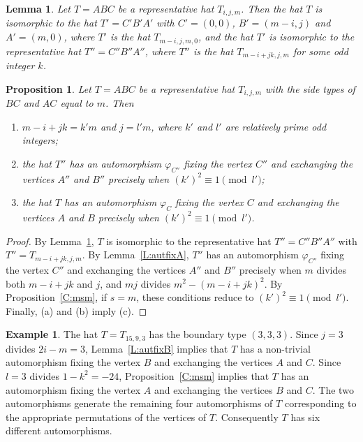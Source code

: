 \documentclass[12pt]{amsart}
\def\p{\varphi}
\theoremstyle{plain}
\newtheorem{proposition}[theorem]{Proposition}
\newtheorem{lemma}[theorem]{Lemma}
\theoremstyle{definition}
\newtheorem{example}[theorem]{Example}
\numberwithin{equation}{section}
\begin{document}
\begin{lemma}\label{L:itom-i}
Let $T = ABC$ be a representative hat $T_{i,j,m}$. Then the hat $T$ is isomorphic to the hat $T' = C'B'A'$ with $C' = (0,0)$, $B' = (m-i,j)$  and $A' = (m,0)$, where $T'$ is the hat
$T_{m-i,j,m,0}$, and the hat $T'$ is isomorphic to the representative hat $T'' = C''B''A''$, where $T''$ is the hat
$T_{m-i+jk,j,m}$ for some odd integer $k$.
\end{lemma}


\begin{proposition}\label{C:rmm}
Let $T = ABC$ be a representative hat $T_{i,j,m}$ with the side types of $BC$ and $AC$ equal to $m$. Then
\begin{enumerate}
\item[(a)] $m-i+jk = k'm$ and $j = l'm$, where $k'$ and $l'$ are relatively prime odd
    integers;
\item[(b)] the hat $T''$ has an automorphism $\p_{C''}$ fixing the vertex $C''$ and exchanging
    the vertices $A''$ and $B''$ precisely when $(k')^2 \equiv 1 \pmod{l'}$;
\item[(c)] the hat $T$ has an automorphism $\p_{C}$ fixing the vertex $C$ and exchanging the
    vertices $A$ and $B$ precisely when $(k')^2 \equiv 1 \pmod{l'}$.
\end{enumerate}
\end{proposition}
\begin{proof}
By Lemma~\ref{L:itom-i}, $T$ is isomorphic to the representative hat $T''= C''B''A''$ with $T'' = T_{m-i+jk,j,m}$.
By Lemma~\ref{L:autfixA}, $T''$ has an automorphism $\p_{C''}$ fixing the vertex $C''$ and
exchanging the vertices $A''$ and $B''$ precisely when $m$ divides both $m-i+jk$ and $j$, and
$mj$ divides $m^2 - (m-i+jk)^2$. By Proposition~\ref{C:msm}, if $s = m$, these conditions reduce to $(k')^2 \equiv 1 \pmod{l'}$. Finally, (a) and (b) imply (c).
\end{proof}


\begin{example}\label{Ex:15,9,3}
The hat $T = T_{15,9,3}$ has the boundary type $(3,3,3)$. Since $j = 3$ divides $2i-m = 3$,
Lemma~\ref{L:autfixB} implies that $T$ has a non-trivial automorphism fixing the vertex $B$ and exchanging the vertices $A$ and $C$. Since $l = 3$ divides $1-k^2 = -24$,
Proposition~\ref{C:msm} implies that $T$ has an automorphism fixing the vertex $A$ and
exchanging
the vertices $B$ and $C$. The two automorphisms generate the remaining four automorphisms of $T$ corresponding to the appropriate permutations of the vertices of $T$. Consequently $T$ has six different automorphisms.
\end{example}
\end{document}
